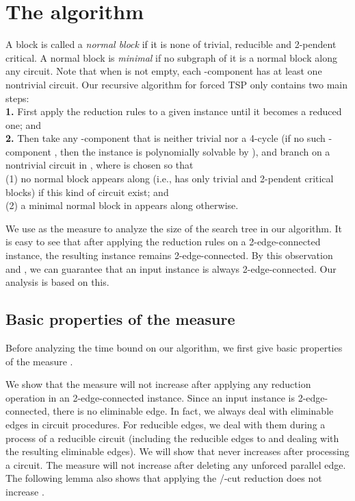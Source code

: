 \documentclass[runningheads]{llncs}
\begin{document}
\section{The algorithm}
A block is called a \emph{normal block} if it is none of trivial, reducible and 2-pendent critical.
A normal block is \emph{minimal} if no subgraph of it is a normal block along any circuit.
Note that when  is not empty, each -component has at least one nontrivial circuit.
Our recursive algorithm for forced TSP  only contains two main steps:\\
{\bf 1.} First apply the reduction rules to a given
instance until it becomes a reduced one; and \\
{\bf 2.} Then take any -component  that is neither trivial nor a 4-cycle
(if no such -component , then the instance is polynomially solvable
by ),
 and branch on a nontrivial circuit  in , where
 is chosen so that \\
(1) no normal block appears along 
(i.e.,  has only trivial and 2-pendent critical blocks)  if this kind of circuit exist;
 and \\
(2)  a minimal normal
 block  in  appears along   otherwise.

We  use  as the measure to analyze the size of the search tree in our algorithm.
It is easy to see that after applying the reduction rules on a 2-edge-connected instance,
 the resulting instance remains 2-edge-connected. By this observation and ,
we can guarantee that  an input instance is always 2-edge-connected. Our analysis is based on this.

\subsection{Basic properties of the measure}
Before analyzing the time bound on our algorithm,
we first give basic properties of  the measure  .

We show that the measure will not increase after applying any reduction operation  in an 2-edge-connected instance.
Since an input instance is 2-edge-connected,  there is no eliminable edge.
In fact, we always deal with eliminable edges in circuit procedures.
For reducible edges, we deal with them during a process of a reducible circuit
(including the reducible edges to  and dealing with the resulting eliminable edges).
We will show that  never increases after processing a circuit.
The measure  will not increase after deleting any unforced parallel edge.
The following lemma also shows that  applying the /-cut reduction does not increase .
\end{document}
